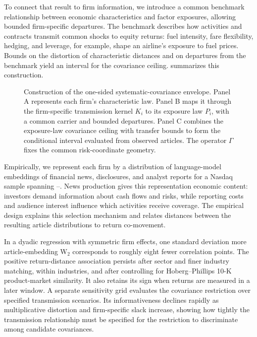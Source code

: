 To connect that result to firm information, we introduce a common benchmark
relationship between economic characteristics and factor exposures, allowing
bounded firm-specific departures.
The benchmark describes how activities and contracts transmit common shocks
to equity returns: fuel intensity, fare flexibility, hedging, and leverage,
for example, shape an airline's exposure to fuel prices.
Bounds on the distortion of characteristic distances and on departures from
the benchmark yield an interval for the covariance ceiling.
 summarizes this construction.

\begin{figure}[H]
  \centering
  \caption{Construction of the one-sided systematic-covariance envelope.
    Panel A represents each firm's characteristic law.
    Panel B maps it through the firm-specific transmission kernel $K_i$ to
    its exposure law $P_i$, with a common carrier and bounded departures.
    Panel C combines the exposure-law covariance ceiling with transfer bounds
    to form the conditional interval evaluated from observed articles.
  The operator $\Gamma$ fixes the common risk-coordinate geometry.}
  \label{fig:continuous-bound-construction}
\end{figure}

Empirically, we represent each firm by a distribution of language-model
embeddings of financial news, disclosures, and analyst reports for a Nasdaq
sample spanning --.
News production gives this representation economic content: investors demand
information about cash flows and risks, while reporting costs and audience
interest influence which activities receive coverage.
The empirical design explains this selection mechanism and relates distances
between the resulting article distributions to return co-movement.

In a dyadic regression with symmetric firm effects, one standard deviation
more article-embedding W$_2$ corresponds to roughly eight fewer correlation points.
The positive return-distance association persists after sector and finer
industry matching, within industries, and after controlling for
Hoberg--Phillips 10-K product-market similarity.
It also retains its sign when returns are measured in a later window.
A separate sensitivity grid evaluates the covariance restriction over
specified transmission scenarios.
Its informativeness declines rapidly as multiplicative distortion and
firm-specific slack increase, showing how tightly the transmission
relationship must be specified for the restriction to discriminate among
candidate covariances.

